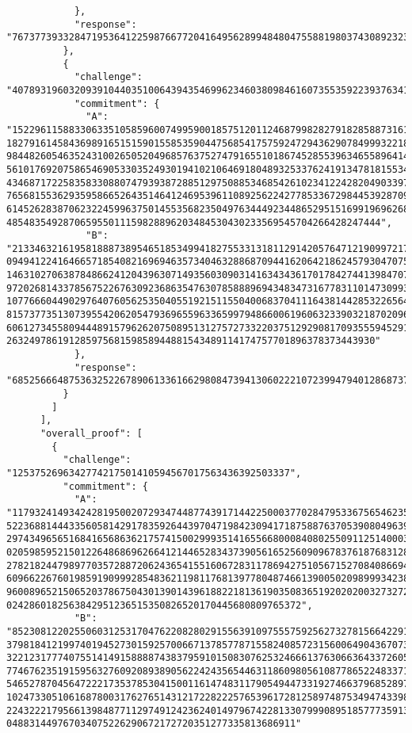 \begin{lstlisting}
            },
            "response": "7673773933284719536412259876677204164956289948480475588198037430892323898227"
          },
          {
            "challenge": "40789319603209391044035100643943546996234603809846160735535922393763413197438",
            "commitment": {
              "A": "15229611588330633510585960074995900185751201124687998282791828588731617663311   1827916145843698916515159015585359044756854175759247294362907849993221809196506   9844826054635243100265052049685763752747916551018674528553963465589641468487511   5610176920758654690533035249301941021064691804893253376241913478181553485244591   4346871722583583308807479393872885129750885346854261023412242820490339759043606   7656815536293595866526435146412469539611089256224277853367298445392870940204815   6145262838706232245996375014553568235049763444923448652951516991969626840520288   485483549287065955011159828896203484530430233569545704266428247444",
              "B": "21334632161958188873895465185349941827553313181129142057647121909972172104037   0949412241646657185408216969463573404632886870944162064218624579304707582596963   1463102706387848662412043963071493560309031416343436170178427441398470731367961   9720268143378567522676309236863547630785888969434834731677831101473099368385817   1077666044902976407605625350405519215115504006837041116438144285322656485495629   8157377351307395542062054793696559633659979486600619606323390321870209617513997   6061273455809444891579626207508951312757273322037512929081709355594529142485152   26324978619128597568159858944881543489114174757701896378373443930"
            },
            "response": "6852566648753632522678906133616629808473941306022210723994794012868737228377"
          }
        ]
      ],
      "overall_proof": [
        {
          "challenge": "1253752696342774217501410594567017563436392503337",
          "commitment": {
            "A": "1179324149342428195002072934744877439171442250003770284795336756546235197855426 522368814443356058142917835926443970471984230941718758876370539080496399506042358 297434965651684165686362175741500299935141655668000840802550911251400036834474612 020598595215012264868696266412144652834373905616525609096783761876831280426954238 278218244798977035728872062436541551606728311786942751056715270840866948571160005 609662267601985919099928548362119811768139778048746613900502098999342388389566561 960089652150652037867504301390143961882218136190350836519202020032732723138632251 0242860182563842951236515350826520170445680809765372",
            "B": "8523081220255060312531704762208280291556391097555759256273278156642291877294539 379818412199740194527301592570066713785778715582408572315600649043670738675502506 322123177740755141491588887438379591015083076253246661376306636433726055276137430 774676235191595632760920893890562242435654463118609805610877865224833719224505707 546527870456472221735378530415001161474831179054944733192746637968528976877448745 102473305106168780031762765143121722822257653961728125897487534947433989719389148 224322217956613984877112974912423624014979674228133079990895185777359134409315459 048831449767034075226290672172720351277335813686911"

\end{lstlisting}
